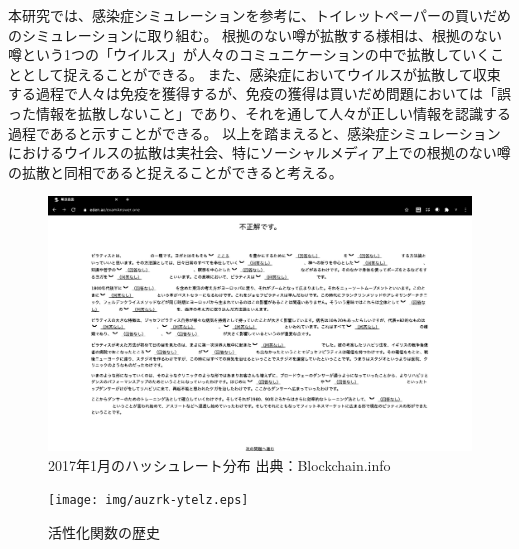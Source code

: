 本研究では、感染症シミュレーションを参考に、トイレットペーパーの買いだめのシミュレーションに取り組む。
根拠のない噂が拡散する様相は、根拠のない噂という1つの「ウイルス」が人々のコミュニケーションの中で拡散していくこととして捉えることができる。
また、感染症においてウイルスが拡散して収束する過程で人々は免疫を獲得するが、免疫の獲得は買いだめ問題においては「誤った情報を拡散しないこと」であり、それを通して人々が正しい情報を認識する過程であると示すことができる。
以上を踏まえると、感染症シミュレーションにおけるウイルスの拡散は実社会、特にソーシャルメディア上での根拠のない噂の拡散と同相であると捉えることができると考える。


\begin{figure}[h]
    \begin{center}
        \includegraphics[scale=15cm]{img/hashrate.eps}
        \caption{2017年1月のハッシュレート分布 出典：Blockchain.info\cite{bitcoinhashrate}}
        \label{img:hashrate}
    \end{center}
\end{figure}
\fi

\begin{figure}[hbtp]
\texttt{[image: img/auzrk-ytelz.eps]}
	\caption{活性化関数の歴史}
	\label{history_af}
\end{figure}
\fi